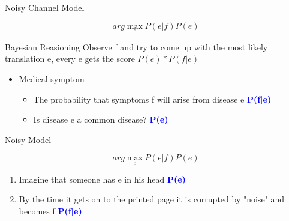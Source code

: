 \documentclass{beamer}
\begin{document}
\begin{frame}{Noisy Channel Model}
    \begin{displaybox}{5cm}     %
    \[ arg\max_{e}{P(e|f)P(e)} \] 
     \end{displaybox} 
    \pause
    
    \begin{block}{Bayesian Reasioning}
        Observe f and try to come up with the most likely translation e, every e gets the score $P(e)*P(f|e)$
        \begin{itemize}
            \item Medical symptom
                \pause
                \begin{itemize}
                    \item The probability that symptoms f will arise from disease e \textcolor{blue}{\textbf{P(f|e)}}
                \pause
                    \item Is disease e a common disease? \textcolor{blue}{\textbf{P(e)}}
                \end{itemize}
        \end{itemize}
    \end{block}
\end{frame}

\begin{frame}{Noisy Model}
    \begin{displaybox}{5cm}     %
    \[ arg\max_{e}{P(e|f)P(e)} \] 
     \end{displaybox} 
    \pause
    \begin{enumerate}
    \item Imagine that someone has e in his head \textcolor{blue}{\textbf{P(e)}} 
    \pause
    \item By the time it gets on to the printed page it is corrupted by "noise" and becomes f \textcolor{blue}{\textbf{P(f|e)}}
    \end{enumerate}
\end{frame}
\end{document}
